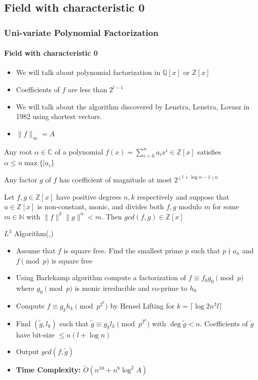 \documentclass[10pt]{beamer}
\begin{document}

\subsection{Field with characteristic 0}
\begin{frame}[allowframebreaks]
\frametitle{Uni-variate Polynomial Factorization}
\framesubtitle{Field with characteristic 0}
\begin{itemize}
	\item We will talk about polynomial factorization in $\mathbb{Q}[x]$ or $\mathbb{Z}[x]$
	\item Coefficients of $f$ are less than $2^{l-1}$
	\item We will talk about the algorithm discovered by Lenstra, Lenstra, Lovasz in 1982 \cite{lllalgo} using shortest vectors.
	\item $\|f\|_{\infty}=A$
\end{itemize}
\begin{theorem}
	Any root $\alpha\in\mathbb{C}$ of a polynomial $f(x)=\sum\limits_{i=0}^na_ix^i\in \mathbb{Z}[x]$ satisfies $\alpha\leq n\max \{|a_i\}$
\end{theorem}
\begin{theorem}
	Any factor $g$ of $f$ has coefficient of magnitude at most $2^{(l+\log n-1)n}$
\end{theorem}
\begin{theorem}
	Let $f,g\in \mathbb{Z}[x]$ have positive degrees $n,k$ respectively and suppose that $u\in\mathbb{Z}[x]$ is non-constant, monic, and divides both $f,g$ modulo $m$ for some $m\in \mathbb{N}$ with $\|f\|^k\|g\|^n<m$. Then $gcd(f,g)\in \mathbb{Z}[x]$
\end{theorem}

{\large{$L^3$ Algorithm}}(\cite{lllalgo},{\cite[Chapter 16]{gathenalgebra}})
\begin{itemize}
	\item Assume that $f$ is square free. Find the smallest prime $p$ such that $p\nmid a_n$ and $f\pmod p$ is square free
	\item Using Barlekamp algorithm compute a factorization of $f\equiv f_0g_0\pmod p$ where $g_0\pmod p$ is monic irreducible and co-prime to $h_0$
	\item Compute $f\equiv g_kh_k\pmod {p^{2^k}}$ by Hensel Lifting for $k=\lceil \log 2n^3l\rceil$
	\item Find $(\tilde{g},l_k)$ such that $\tilde{g}\equiv g_kl_k\pmod{p^{2^k}}$ with $\deg \tilde{g}<n$. Coefficients of $\tilde{g}$ have bit-size $\leq n(l+\log n)$
	\item Output $gcd(f,\tilde{g})$
	\item \textbf{Time Complexity: }$\tilde{O}(n^{10}+n^8\log^2A)$ 
\end{itemize}


\end{frame}
\end{document}
